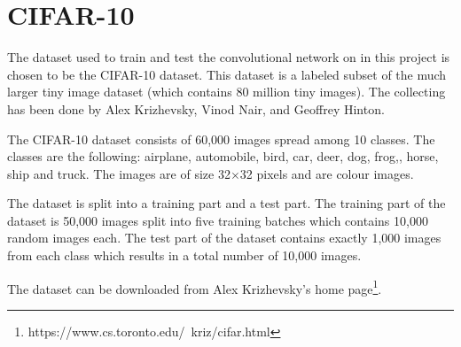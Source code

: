 \graphicspath{{Chapters/Project/}}

\section{CIFAR-10} %
\label{sec:cifar_10}

The dataset used to train and test the convolutional network on in this project is chosen to be the CIFAR-10 dataset. This dataset is a labeled subset of the much larger tiny image dataset (which contains 80 million tiny images). The collecting has been done by Alex Krizhevsky, Vinod Nair, and Geoffrey Hinton.

The CIFAR-10 dataset consists of 60,000 images spread among 10 classes. The classes are the following: airplane, automobile, bird, car, deer, dog, frog,, horse, ship and truck. The images are of size 32$\times$32 pixels and are colour images.

The dataset is split into a training part and a test part. The training part of the dataset is 50,000 images split into five training batches which contains 10,000 random images each. The test part of the dataset contains exactly 1,000 images from each class which results in a total number of 10,000 images.

The dataset can be downloaded from Alex Krizhevsky's home page\footnote{https://www.cs.toronto.edu/~kriz/cifar.html}.

